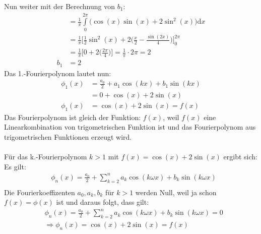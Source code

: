 Nun weiter mit der Berechnung von $ b_1 $:\\
\begin{align*}
&=\frac{1}{\pi}\int\limits_{0}^{2\pi} \big(\cos(x)\sin(x)+2\sin^2(x)\big)\mathrm{d}x\\
&=\frac{1}{\pi}\bigg[\frac{1}{2}\sin^2(x)+2\bigg(\frac{x}{2}-\frac{\sin(2x)}{4}\bigg)\bigg]^{2\pi}_0\\
&=\frac{1}{\pi}\bigg[0+2\bigg(\frac{2\pi}{4}\bigg)\bigg]=\frac{1}{\pi}\cdot 2\pi=2\\
b_1&=2
\end{align*}
Das 1.-Fourierpolynom lautet nun:\\
\begin{align*}
\phi_1(x)&=\frac{a_0}{2} +a_1\cos(kx)+b_1\sin(k x)\\
&=0+\cos(x)+2\sin(x)\\
\phi_1(x)&=\cos(x)+2\sin(x)=f(x)
\end{align*}
Das Fourierpolynom ist gleich der Funktion: $ f(x) $, weil $ f(x) $ eine Linearkombination von trigometrischen Funktion ist und das Fourierpolynom aus trigometrischen Funktionen erzeugt wird.\\
\\
Für das k.-Fourierpolynom $ k>1 $ mit $ f(x)=\cos(x)+2\sin(x) $ ergibt sich:\\
Es gilt:\\
\begin{align*}
& \phi_n(x)=\frac{a_0}{2} +\sum\limits_{k=2}^{n}a_k\cos(k\omega x)+b_k\sin(k\omega x)\\
\end{align*}
Die Fourierkoeffizenten $a_0, a_k, b_k $ für $ k>1 $ werden Null, weil ja schon $ f(x)=\phi(x) $ ist und daraus folgt, dass gilt:\\
\begin{align*}
& \phi_n(x)=\frac{a_0}{2} +\sum\limits_{k=2}^{n}a_k\cos(k\omega x)+b_k\sin(k\omega x)=0\\
&\Rightarrow \phi_n(x)=\cos(x)+2\sin(x)=f(x)\\
\end{align*}
